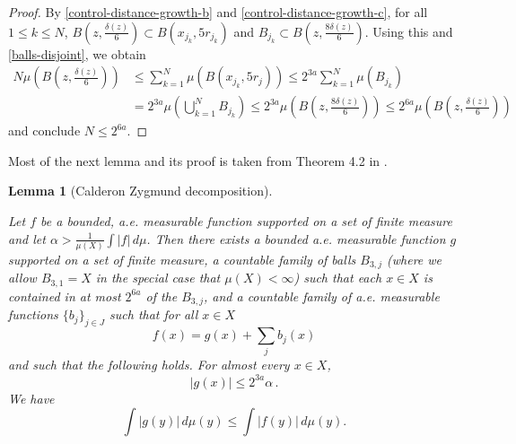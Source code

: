 \documentclass[10pt,a4paper]{article}
\theoremstyle{plain}
\newtheorem{lemma}[theorem]{Lemma}
\theoremstyle{definition}
\numberwithin{equation}{subsection}
\newcommand{\lean}[1]{}
\newcommand{\uses}[1]{}
\newcommand{\leanok}{}
\begin{document}
\begin{proof}
By \eqref{control-distance-growth-b} and \eqref{control-distance-growth-c}, for all $1\le k \le N$, $B(z,\frac{\delta(z)}{6}) \subset B(x_{j_k}, 5r_{j_k})$ and $B_{j_k} \subset B(z,\frac{8\delta(z)}{6})$. Using this and \eqref{balls-disjoint}, we obtain
\begin{align}
    N \mu(B(z,\frac{\delta(z)}{6})) &\le \sum_{k=1}^N \mu(B(x_{j_k}, 5r_j)) \le 2^{3a} \sum_{k=1}^N \mu(B_{j_k}) \\
    &= 2^{3a} \mu(\bigcup_{k=1}^N B_{j_k}) \le 2^{3a} \mu(B(z,\frac{8\delta(z)}{6})) \le 2^{6a} \mu(B(z,\frac{\delta(z)}{6}))
\end{align}
and conclude $N\le 2^{6a}$.
\end{proof}

Most of the next lemma and its proof is taken from Theorem 4.2 in \cite{stein-book}.
\begin{lemma}[Calderon Zygmund decomposition]
    \label{Calderon-Zygmund-decomposition}
    \leanok
    \lean{encard_czBall3_le, tsum_czRemainder', aemeasurable_czApproximation, czApproximation_add_czRemainder, enorm_czApproximation_le, enorm_czApproximation_le_infinite, eLpNorm_czApproximation_le, support_czRemainder'_subset, integral_czRemainder', integral_czRemainder, eLpNorm_czRemainder'_le, eLpNorm_czRemainder_le, tsum_volume_czBall3_le, volume_univ_le, tsum_eLpNorm_czRemainder'_le, tsum_eLpNorm_czRemainder_le}
    \uses{ball-covering,Lebesgue-differentiation,maximal-theorem}
    Let $f$ be a bounded, a.e. measurable function supported on a set of finite measure and let $\alpha>\frac{1}{\mu(X)}\int |f|\,d\mu$.
    Then there exists a bounded a.e. measurable function $g$ supported on a set of finite measure, a countable family of balls $B_{3,j}$ (where we allow $B_{3,1} = X$ in the special case that $\mu(X)<\infty$)
    such that each $x\in X$ is contained in at most $2^{6a}$ of the $B_{3,j}$, and a countable family of a.e. measurable functions $\{b_j\}_{j\in J}$ such that for all $x \in X$
    \begin{equation}
       \label{eq-gb-dec}
       f(x)= g(x) + \sum_{j} b_j(x)
    \end{equation}
    and such that the following holds. For almost every $x\in X$,
    \begin{equation}
        \label{eq-g-max}
       |g(x)|\leq 2^{3a} \alpha\,.
    \end{equation}
    We have
    \begin{equation}
        \label{eq-g-L1-norm}
        \int |g(y)|\, d\mu(y)\leq \int |f(y)|\, d\mu(y).

\end{equation}
\end{lemma}
\end{document}

